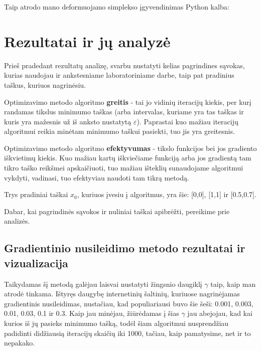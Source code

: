 \documentclass{article}
\begin{document}
Taip atrodo mano deformuojamo simplekso įgyvendinimas Python kalba:
\section{Rezultatai ir jų analyzė}
Prieš pradedant rezultatų analizę, svarbu nustatyti kelias pagrindines sąvokas, kurias naudojau ir ankstesniame laboratoriniame darbe, taip pat pradinius taškus, kuriuos nagrinėsiu.

Optimizavimo metodo algoritmo \textbf{greitis} - tai jo vidinių iteracijų kiekis, per kurį randamas tikslus minimumo taškas (arba intervalas, kuriame yra tas taškas ir kuris yra mažesnis už iš anksto nustatytą $\varepsilon$). Paprastai kuo mažiau iteracijų algoritmui reikia minėtam minimumo taškui pasiekti, tuo jis yra greitesnis. 

Optimizavimo metodo algoritmo \textbf{efektyvumas} - tikslo funkcijos bei jos gradiento iškvietimų kiekis. Kuo mažiau kartų iškviečiame funkciją arba jos gradientą tam tikro taško reikšmei apskaičiuoti, tuo mažiau išteklių sunaudojame algoritmui vykdyti, vadinasi, tuo efektyviau naudoti tam tikrą metodą. 

Trys pradiniai taškai $x_{0}$, kuriuos įvesiu į algoritmus, yra šie: [0,0], [1,1] ir [0.5,0.7].

Dabar, kai pagrindinės sąvokos ir nuliniai taškai apibrėžti, pereikime prie analizės.
\subsection{Gradientinio nusileidimo metodo rezultatai ir vizualizacija}
Taikydamas šį metodą galėjau laisvai nustatyti žingsnio daugiklį $\gamma$ taip, kaip man atrodė tinkama. Ištyręs daugybę internetinių šaltinių, kuriuose nagrinėjamas gradientinis nusileidimas, nustačiau, kad populiariausi buvo šie šeši: 0.001, 0.003, 0.01, 0.03, 0.1 ir 0.3. Kaip jau minėjau, žiūrėdamas į šias $\gamma$ jau abejojau, kad kai kurios iš jų pasieks minimumo tašką, todėl šiam algoritmui nusprendžiau padidinti didžiausią iteracijų skaičių iki 1000, tačiau, kaip pamatysime, net ir to nepakako. 
\end{document}
